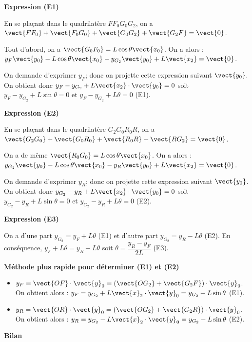 \documentclass[11pt]{article}
\begin{document}
\begin{UPSTIcorrige}

\textbf{Expression (E1)}

En se plaçant dans le quadrilatère $F F_0 G_0 G_2$, on a $\vect{F F_0} + \vect{F_0 G_0}+\vect{G_0 G_2}+\vect{G_2 F}=\vect{0}$. 

Tout d'abord, on a $\vect{G_0 F_0} = L\cos \theta \vect{x_0}$. On a alors : $y_F \vect{y_0} - L\cos \theta \vect{x_0} - y_{G_2} \vect{y_0} + L\vect{x_2}=\vect{0}$.  

On demande d'exprimer $y_F$; donc on projette cette expression suivant  $\vect{y_0}$. On obtient donc 
$y_F - y_{G_2}  + L\vect{x_2}\cdot \vect{y_0}=0$ soit $y_F - y_{G_2}  + L\sin \theta=0$ et   $y_F - y_{G_2}  + L \theta=0$  (E1).

\textbf{Expression (E2)}

En se plaçant dans le quadrilatère $G_2 G_0 R_0 R$, on a $\vect{G_2 G_0} + \vect{ G_0 R_0}+\vect{R_0 R}+\vect{R G_2 }=\vect{0}$. 

On a de même $\vect{R_0 G_0} = L\cos \theta \vect{x_0}$. On a alors : $y_{G_2} \vect{y_0} - L\cos \theta \vect{x_0} - y_{R} \vect{y_0} + L\vect{x_2}=\vect{0}$.  

On demande d'exprimer $y_R$; donc on projette cette expression suivant  $\vect{y_0}$. On obtient donc 
$y_{G_2}  - y_{R}  + L\vect{x_2}\cdot \vect{y_0}=0$ soit $y_{G_2}  - y_{R}  + L\sin \theta=0$ et $y_{G_2}  - y_{R}  + L \theta=0$ (E2).


\textbf{Expression (E3)}

On a d'une part $y_{G_2} = y_F  + L \theta$  (E1) et d'autre part $y_{G_2}  = y_{R}  - L \theta$ (E2).
En conséquence,  $y_F  + L \theta =  y_{R}  - L \theta$  soit $  \theta = \dfrac{ y_{R} - y_F}{2L } $ (E3).

\textbf{Méthode plus rapide pour déterminer (E1) et (E2)}

\begin{itemize}
\item $y_F=\vect{OF}\cdot \vect{y}_0=\left(\vect{OG_2}+\vect{G_2F}\right)\cdot \vect{y}_0$. 
On obtient alors : 
$y_F=y_{G_2}+L\vect{x}_2\cdot \vect{y}_0=y_{G_2}+L\sin\theta$ (E1).

\item $y_R=\vect{OR}\cdot \vect{y}_0=\left(\vect{OG_2}+\vect{G_2R}\right)\cdot \vect{y}_0$.
On obtient alors : 
$y_R=y_{G_2}-L\vect{x}_2\cdot \vect{y}_0=y_{G_2}-L\sin\theta$ (E2).
\end{itemize}


\textbf{Bilan}


\end{UPSTIcorrige}
\end{document}
